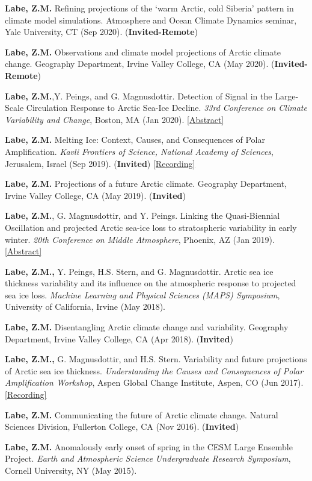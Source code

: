 \documentclass[margin,line,palatino,courier,10pt]{res}
\begin{document}
\begin{resume}
\begin{etaremune}[leftmargin=0in,topsep=0in,parsep=0in]
\item \textbf{Labe, Z.M.} Refining projections of the `warm Arctic, cold Siberia' pattern in climate model simulations. Atmosphere and Ocean Climate Dynamics seminar, Yale University, CT (Sep 2020). (\textbf{Invited-Remote})
\item \textbf{Labe, Z.M.} Observations and climate model projections of Arctic climate change. Geography Department, Irvine Valley College, CA (May 2020). (\textbf{Invited-Remote})
\item \textbf{Labe, Z.M.},Y. Peings, and G. Magnusdottir. Detection of Signal in the Large-Scale Circulation Response to Arctic Sea-Ice Decline. \textit{33rd Conference on Climate Variability and Change}, Boston, MA (Jan 2020). \href{https://ams.confex.com/ams/2020Annual/meetingapp.cgi/Paper/367289}{[Abstract]}
\item \textbf{Labe, Z.M.} Melting Ice: Context, Causes, and Consequences of Polar Amplification. \textit{Kavli Frontiers of Science, National Academy of Sciences}, Jerusalem, Israel (Sep 2019). (\textbf{Invited}) \href{https://vimeo.com/362912204}{[Recording]}
\item \textbf{Labe, Z.M.} Projections of a future Arctic climate. Geography Department, Irvine Valley College, CA (May 2019). (\textbf{Invited})
\item \textbf{Labe, Z.M.}, G. Magnusdottir, and Y. Peings. Linking the Quasi-Biennial Oscillation and projected Arctic sea-ice loss to stratospheric variability in early winter. \textit{20th Conference on Middle Atmosphere}, Phoenix, AZ (Jan 2019). \href{https://ams.confex.com/ams/2019Annual/meetingapp.cgi/Paper/352664}{[Abstract]}
\item \textbf{Labe, Z.M.,} Y. Peings, H.S. Stern, and G. Magnusdottir. Arctic sea ice thickness variability and its influence on the atmospheric response to projected sea ice loss. \textit{Machine Learning and Physical Sciences (MAPS) Symposium}, University of California, Irvine (May 2018). 
\item \textbf{Labe, Z.M.} Disentangling Arctic climate change and variability. Geography Department, Irvine Valley College, CA (Apr 2018). (\textbf{Invited})
\item \textbf{Labe, Z.M.,} G. Magnusdottir, and H.S. Stern. Variability and future projections of Arctic sea ice thickness. \textit{Understanding the Causes and Consequences of Polar Amplification Workshop}, Aspen Global Change Institute, Aspen, CO (Jun 2017). \href{https://www.agci.org/lib/17s1/variability-and-future-projections-arctic-sea-ice-thickness}{[Recording]}
\item \textbf{Labe, Z.M.} Communicating the future of Arctic climate change. Natural Sciences Division, Fullerton College, CA (Nov 2016). (\textbf{Invited})
\item \textbf{Labe, Z.M.} Anomalously early onset of spring in the CESM Large Ensemble Project. \textit{Earth and Atmospheric Science Undergraduate Research Symposium}, Cornell University, NY (May 2015). 


\end{etaremune}
\end{resume}
\end{document}
